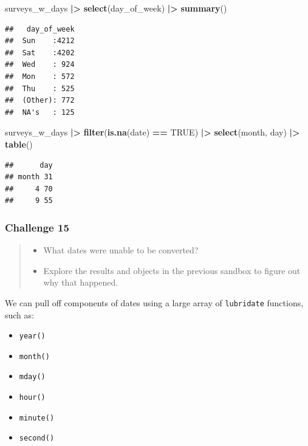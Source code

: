 \documentclass[
  10pt,
  letterpaper,
  twoside,
  openright]{book}
\newenvironment{Shaded}{\begin{snugshade}}{\end{snugshade}}
\newcommand{\ConstantTok}[1]{\textcolor[rgb]{0.56,0.35,0.01}{#1}}
\newcommand{\FunctionTok}[1]{\textcolor[rgb]{0.13,0.29,0.53}{\textbf{#1}}}
\newcommand{\NormalTok}[1]{#1}
\newcommand{\SpecialCharTok}[1]{\textcolor[rgb]{0.81,0.36,0.00}{\textbf{#1}}}
\providecommand{\tightlist}{%
  \setlength{\itemsep}{0pt}\setlength{\parskip}{0pt}}
\begin{document}
\begin{Shaded}
\begin{Highlighting}[]
\NormalTok{surveys\_w\_days }\SpecialCharTok{|\textgreater{}}
  \FunctionTok{select}\NormalTok{(day\_of\_week) }\SpecialCharTok{|\textgreater{}}
  \FunctionTok{summary}\NormalTok{()}
\end{Highlighting}
\end{Shaded}

\begin{verbatim}
##   day_of_week  
##  Sun    :4212  
##  Sat    :4202  
##  Wed    : 924  
##  Mon    : 572  
##  Thu    : 525  
##  (Other): 772  
##  NA's   : 125
\end{verbatim}

\begin{Shaded}
\begin{Highlighting}[]
\NormalTok{surveys\_w\_days }\SpecialCharTok{|\textgreater{}} 
  \FunctionTok{filter}\NormalTok{(}\FunctionTok{is.na}\NormalTok{(date) }\SpecialCharTok{==} \ConstantTok{TRUE}\NormalTok{) }\SpecialCharTok{|\textgreater{}} 
  \FunctionTok{select}\NormalTok{(month, day) }\SpecialCharTok{|\textgreater{}} 
  \FunctionTok{table}\NormalTok{()}
\end{Highlighting}
\end{Shaded}

\begin{verbatim}
##      day
## month 31
##     4 70
##     9 55
\end{verbatim}

\hypertarget{challenge-15}{%
\subsubsection{Challenge 15}\label{challenge-15}}

\begin{quote}
\begin{itemize}
\tightlist
\item
  What dates were unable to be converted?
\item
  Explore the results and objects in the previous sandbox to figure out
  why that happened.
\end{itemize}
\end{quote}

We can pull off components of dates using a large array of
\texttt{lubridate} functions, such as:

\begin{itemize}
\tightlist
\item
  \texttt{year()}
\item
  \texttt{month()}
\item
  \texttt{mday()}
\item
  \texttt{hour()}
\item
  \texttt{minute()}
\item
  \texttt{second()}
\end{itemize}
\end{document}
